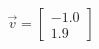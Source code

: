 \documentclass[preview]{standalone}
\begin{document}
\begin{align*}
\vec{v}=\begin{bmatrix}-1.0\\1.9\end{bmatrix}
\end{align*}
\end{document}
